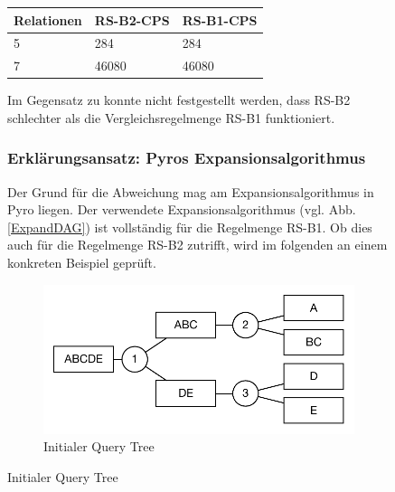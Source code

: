 \begin{figure}[h]
\centering

\begin{tabular}{|l|l|l|}
\hline
Relationen & RS-B2-CPS & RS-B1-CPS \\ \hline
5          & 284       & 284       \\ \hline
7          & 46080     & 46080     \\ \hline
\end{tabular}





\caption{Anzahl Pläne nach Regelmenge und Anzahl-Relationen}
\label{protoUnvollstaendig}
\endfigure

Im Gegensatz zu \cite{bachelor} konnte nicht festgestellt werden, dass RS-B2 schlechter als die Vergleichsregelmenge RS-B1 funktioniert.


\subsubsection{Erklärungsansatz: Pyros Expansionsalgorithmus}

Der Grund für die Abweichung mag am Expansionsalgorithmus in Pyro liegen. Der verwendete Expansionsalgorithmus (vgl. Abb. \ref{ExpandDAG}) ist vollständig für die Regelmenge RS-B1. Ob dies auch für die Regelmenge RS-B2 zutrifft, wird im folgenden an einem konkreten Beispiel geprüft.

\begin{figure}[ht]
  \centering
  \includegraphics[scale=0.75]{05_ResultsEvaluation/00_media/PyroInital_0.pdf}
  \caption{Initialer Query Tree}
  \label{PyroInital}
\end{figure}


\end{figure}
